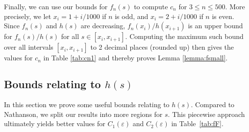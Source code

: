 \documentclass[12pt]{amsart}
\begin{document}
Finally, we can use our bounds for $f_n(s)$ to compute $c_n$ for $3\le n\le 500$. More precisely, we let $x_i=1+i/1000$ if $n$ is odd, and $x_i=2+i/1000$ if $n$ is even. Since $f_n(s)$ and $h(s)$ are decreasing, $f_n\left(x_{i}\right)/h\left(x_{i+1}\right)$ is an upper bound for $f_n(s)/h(s)$ for all $s \in [x_i, x_{i+1}]$. Computing the maximum such bound over all intervals $[x_i,x_{i+1}]$ to 2 decimal places (rounded up) then gives the values for $c_n$ in Table \ref{tab:cn1} and thereby proves Lemma \ref{lemma:fsmall}.
\subsection{Bounds relating to $h(s)$}
\label{AA}
In this section we prove some useful bounds relating to $h(s)$. Compared to Nathanson, we split our results into more regions for $s$. This piecewise approach ultimately yields better values for $C_1(\varepsilon)$ and $C_2(\varepsilon)$ in Table~\ref{tab:fF}. 
\end{document}
